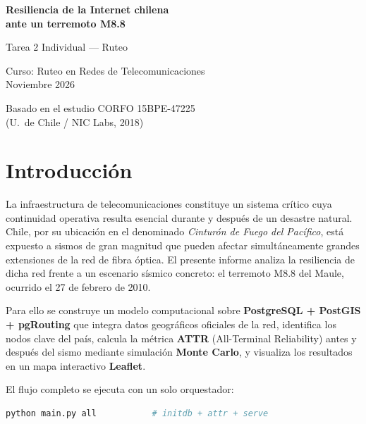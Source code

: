\documentclass[12pt,a4paper]{article}
\begin{document}
\begin{titlepage}
\centering
\vspace*{3cm}
{\LARGE\bfseries Resiliencia de la Internet chilena\\ante un terremoto M8.8\par}
\vspace{1.5cm}
{\Large Tarea 2 Individual --- Ruteo\par}
\vspace{2cm}
{\large
Curso: Ruteo en Redes de Telecomunicaciones\\[6pt]
Noviembre 2026\par}
\vfill
{\small Basado en el estudio CORFO 15BPE-47225\\
(U.\ de Chile / NIC Labs, 2018)\par}
\end{titlepage}

\tableofcontents
\newpage

\section{Introducción}

La infraestructura de telecomunicaciones constituye un sistema crítico cuya
continuidad operativa resulta esencial durante y después de un desastre
natural.  Chile, por su ubicación en el denominado \emph{Cinturón de Fuego
del Pacífico}, está expuesto a sismos de gran magnitud que pueden afectar
simultáneamente grandes extensiones de la red de fibra óptica.  El presente
informe analiza la resiliencia de dicha red frente a un escenario sísmico
concreto: el terremoto M8.8 del Maule, ocurrido el 27 de febrero de 2010.

Para ello se construye un modelo computacional sobre \textbf{PostgreSQL +
PostGIS + pgRouting} que integra datos geográficos oficiales de la red,
identifica los nodos clave del país, calcula la métrica \textbf{ATTR}
(All-Terminal Reliability) antes y después del sismo mediante simulación
\textbf{Monte Carlo}, y visualiza los resultados en un mapa interactivo
\textbf{Leaflet}.

El flujo completo se ejecuta con un solo orquestador:

\begin{lstlisting}[language=bash,caption={Ejecución del proyecto}]
python main.py all           # initdb + attr + serve
\end{lstlisting}


\end{document}
